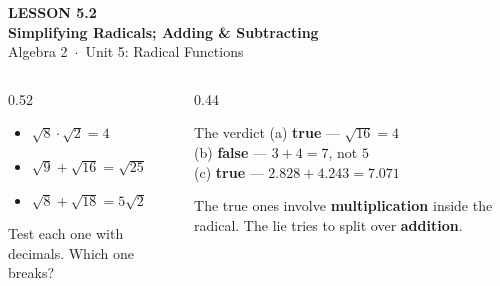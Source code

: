 \documentclass[aspectratio=169, 11pt]{beamer}
\begin{document}
{
\begin{frame}[plain]
  \vspace{2.8cm}\hspace{0.55cm}%
  \begin{minipage}{0.9\textwidth}
    {\color{goldacc}\bfseries\small LESSON 5.2}\\[0.5cm]
    {\color{white}\bfseries\LARGE Simplifying Radicals; Adding \& Subtracting}\\[1.2cm]
    {\color{forestmid}\small Algebra 2~$\cdot$~Unit 5: Radical Functions}
  \end{minipage}
\end{frame}
}

\begin{frame}[t, plain]
  \begin{columns}[T]
    \begin{column}{0.52\textwidth}
      \begin{itemize}\setlength{\itemsep}{8pt}
        \item[(a)] $\sqrt{8}\cdot\sqrt{2} = 4$
        \item[(b)] $\sqrt{9}+\sqrt{16} = \sqrt{25}$
        \item[(c)] $\sqrt{8}+\sqrt{18} = 5\sqrt{2}$
      \end{itemize}
      \vspace{6pt}
      {\footnotesize Test each one with decimals. Which one breaks?}
    \end{column}
    \begin{column}{0.44\textwidth}
      \begin{block}{The verdict}
        (a) \textbf{true} --- $\sqrt{16}=4$ \\[3pt]
        (b) \textcolor{keyred}{\textbf{false}} --- $3+4=7$, not $5$ \\[3pt]
        (c) \textbf{true} --- $2.828+4.243=7.071$
      \end{block}
      \vspace{3pt}
      {\footnotesize The true ones involve \textbf{multiplication} inside the radical. The lie tries
      to split over \textbf{addition}.}
    \end{column}
  \end{columns}
\end{frame}
\end{document}
